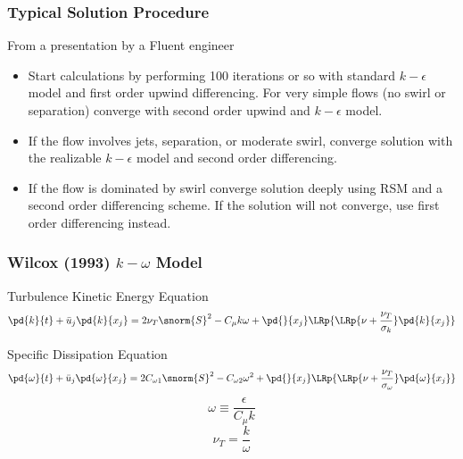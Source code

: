 \documentclass{beamer}
\begin{document}
\begin{frame}\frametitle{Typical Solution Procedure}
\begin{block}{From a presentation by a Fluent engineer}
\begin{itemize}
  \item Start calculations by performing 100 iterations or so with standard
  $k-\epsilon$ model and first order upwind differencing. For very simple
  flows (no swirl or separation) converge with second order upwind and
  $k-\epsilon$ model.
  \item If the flow involves jets, separation, or moderate swirl, converge
  solution with the realizable $k-\epsilon$ model and second order
  differencing.
  \item If the flow is dominated by swirl converge solution deeply using RSM
  and a second order differencing scheme. If the solution will not converge,
  use first order differencing instead.
\end{itemize}

\end{block}
\end{frame}

\begin{frame}\frametitle{Wilcox (1993) $k-\omega$ Model }
\begin{block}{Turbulence Kinetic Energy Equation}
\[
\pd{k}{t}+\bar u_j\pd{k}{x_j}=2\nu_T\snorm{S}^2-C_\mu k\omega
+\pd{}{x_j}\LRp{\LRp{\nu+\frac{\nu_T}{\sigma_k}}\pd{k}{x_j}}
\]
\end{block}
\begin{block}{Specific Dissipation Equation}
\[
\pd{\omega}{t}+\bar u_j\pd{\omega}{x_j}=2C_{\omega1}\snorm{S}^2-C_{\omega2}\omega^2
+\pd{}{x_j}\LRp{\LRp{\nu+\frac{\nu_T}{\sigma_\omega}}\pd{\omega}{x_j}}
\]
\[
\omega\equiv\frac{\epsilon}{C_\mu k}
\]
\[
\nu_T=\frac{k}{\omega}
\]
\end{block}
\end{frame}
\end{document}
